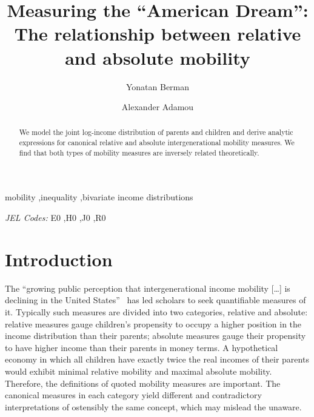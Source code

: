 \documentclass[final,10pt,5p,twocolumn,authoryear]{elsarticle}
\numberwithin{equation}{section}
\begin{document}
\begin{frontmatter}

\title{Measuring the ``American Dream'': The relationship between relative and absolute mobility}

\author[mysecondaryaddress]{Yonatan Berman}
\address[mysecondaryaddress]{School of Physics and Astronomy, Tel-Aviv University, Tel-Aviv, 6997801, Israel}

\author[mysecondaryaddress2]{Alexander Adamou}
\address[mysecondaryaddress2]{London Mathematical Laboratory, 14 Buckingham Street, London, WC2N 6DF, UK}

\begin{abstract}
We model the joint log-income distribution of parents and children and derive analytic expressions for canonical relative and absolute intergenerational mobility measures. We find that both types of mobility measures are inversely related theoretically.
\end{abstract}

\begin{keyword}
mobility \sep inequality \sep bivariate income distributions

\textit{JEL Codes:} E0 \sep H0 \sep J0 \sep R0
\end{keyword}

\end{frontmatter}


\section{Introduction}

The ``growing public perception that intergenerational income mobility [\ldots] is declining in the United States''~\citep[p.~141]{chetty2014united} has led scholars to seek quantifiable measures of it. Typically such measures are divided into two categories, relative and absolute: relative measures gauge children's propensity to occupy a higher position in the income distribution than their parents; absolute measures gauge their propensity to have higher income than their parents in money terms. A hypothetical economy in which all children have exactly twice the real incomes of their parents would exhibit minimal relative mobility and maximal absolute mobility. Therefore, the definitions of quoted mobility measures are important. The canonical measures in each category yield different and contradictory interpretations of ostensibly the same concept, which may mislead the unaware.
\end{document}
